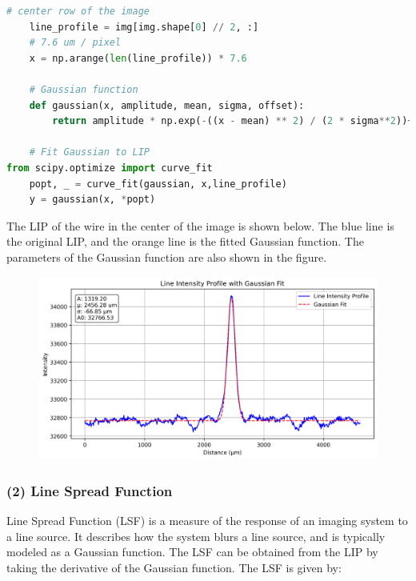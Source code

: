 \documentclass[12pt, a4paper, oneside]{ctexart}
\begin{document}
\begin{lstlisting}[style=mystyle,language=Python]
	# center row of the image
	line_profile = img[img.shape[0] // 2, :]
	# 7.6 um / pixel
	x = np.arange(len(line_profile)) * 7.6  

	# Gaussian function
	def gaussian(x, amplitude, mean, sigma, offset):
		return amplitude * np.exp(-((x - mean) ** 2) / (2 * sigma**2))+ offset

	# Fit Gaussian to LIP
from scipy.optimize import curve_fit
	popt, _ = curve_fit(gaussian, x,line_profile)
	y = gaussian(x, *popt)

\end{lstlisting}

The LIP of the wire in the center of the image is shown below. The blue line is the original LIP, and the orange line is the fitted Gaussian function. The parameters of the Gaussian function are also shown in the figure.

\begin{figure}[htp]
	\centering
	\includegraphics[width=1\textwidth]{./result/lip_gaussian_fit.png}

\end{figure}


\subsubsection*{(2) Line Spread Function}

Line Spread Function (LSF) is 
a measure of the response of an imaging system to a line source. It describes how the system blurs a line source, and is typically modeled as a Gaussian function. The LSF can be obtained from the LIP by taking the derivative of the Gaussian function. The LSF is given by:
\end{document}
